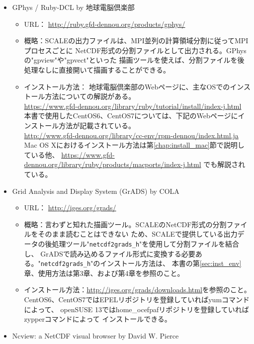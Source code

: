 \begin{itemize}
\item GPhys / Ruby-DCL by 地球電脳倶楽部\\
 \begin{itemize}
  \item URL： \url{http://ruby.gfd-dennou.org/products/gphys/}
  \item 概略：SCALEの出力ファイルは、MPI並列の計算領域分割に従ってMPIプロセスごとに
              NetCDF形式の分割ファイルとして出力される。GPhysの"gpview"や"gpvect"といった
              描画ツールを使えば、分割ファイルを後処理なしに直接開いて描画することができる。
  \item インストール方法：
  地球電脳倶楽部のWebページに、主なOSでのインストール方法についての解説がある。\\
  \url{https://www.gfd-dennou.org/library/ruby/tutorial/install/index-j.html}\\
  本書で使用したCentOS6、CentOS7については、下記のWebページにインストール方法が記載されている。\\
  \url{http://www.gfd-dennou.org/library/cc-env/rpm-dennou/index.html.ja}\\
   Mac OS Xにおけるインストール方法は第\ref{chap:install_mac}節で説明している他、
   \url{https://www.gfd-dennou.org/library/ruby/products/macports/index-j.html}
   でも解説されている。
   \end{itemize}
\item Grid Analysis and Display System (GrADS) by COLA\\
 \begin{itemize}
  \item URL： \url{http://iges.org/grads/}
  \item 概略：言わずと知れた描画ツール。SCALEのNetCDF形式の分割ファイルをそのまま読むことはできない
             ため、SCALEで提供している出力データの後処理ツール"\verb|netcdf2grads_h|"を使用して分割ファイルを結合し、
             GrADSで読み込めるファイル形式に変換する必要ある。"\verb|netcdf2grads_h|"のインストール方法は、
本書の第\ref{sec:inst_env}章、使用方法は第3章、および第4章を参照のこと。
  \item インストール方法：\url{http://iges.org/grads/downloads.html}を参照のこと。
                        CentOS6、CentOS7ではEPELリポジトリを登録していればyumコマンドによって、
                        openSUSE 13ではhome\_ocefpafリポジトリを登録していればzypperコマンドによって
                        インストールできる。
 \end{itemize}
\item Ncview: a NetCDF visual browser by David W. Pierce\\

\end{itemize}
